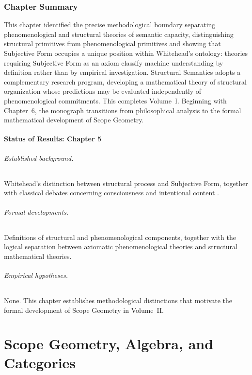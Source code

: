 \documentclass[11pt,twoside,openright]{book}
\numberwithin{equation}{chapter}
\theoremstyle{definition}
\theoremstyle{plain}
\theoremstyle{remark}
\theoremstyle{definition}
\begin{document}
\section{Chapter Summary}

This chapter identified the precise methodological boundary separating
phenomenological and structural theories of semantic capacity,
distinguishing structural primitives from phenomenological primitives and
showing that Subjective Form occupies a unique position within
Whitehead's ontology: theories requiring Subjective Form as an axiom
classify machine understanding by definition rather than by empirical
investigation. Structural Semantics adopts a complementary research
program, developing a mathematical theory of structural organization
whose predictions may be evaluated independently of phenomenological
commitments. This completes Volume~I. Beginning with Chapter~6, the
monograph transitions from philosophical analysis to the formal
mathematical development of Scope Geometry.

\subsection*{Status of Results: Chapter 5}

\paragraph{Established background.} Whitehead's distinction between
structural process and Subjective Form, together with classical debates
concerning consciousness and intentional content \cite{Whitehead1929,
Nagel1974,Searle1980}.

\paragraph{Formal developments.} Definitions of structural and
phenomenological components, together with the logical separation between
axiomatic phenomenological theories and structural mathematical theories.

\paragraph{Empirical hypotheses.} None. This chapter establishes
methodological distinctions that motivate the formal development of
Scope Geometry in Volume~II.

\part{Scope Geometry, Algebra, and Categories}
\end{document}
